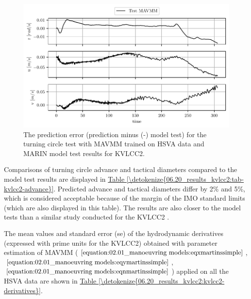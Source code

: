 \begin{figure}[h!]
\centering
\includegraphics[width=1.0\textwidth]{kappa/images/19.pdf}
\caption{The prediction error (prediction minus (-) model test) for the turning circle test with MAVMM trained on HSVA data and MARIN model test results for KVLCC2.}\label{\detokenize{06.20_results_kvlcc2:fig-kvlcc2-testing-sim-error}}\end{figure} 

Comparisons of turning circle advance and tactical diameters compared to the model test results are displayed in \hyperref[\detokenize{06.20_results_kvlcc2:tab-kvlcc2-advance}]{Table \ref{\detokenize{06.20_results_kvlcc2:tab-kvlcc2-advance}}}. Predicted advance and tactical diameters differ by 2\% and 5\%, which is considered acceptable because of the margin of the IMO standard limits (which are also displayed in this table). The results are also closer to the model tests than a similar study conducted for the KVLCC2 \cite{he_nonparametric_2022}.

\clearpage
The mean values and standard error (se) of the hydrodynamic derivatives (expressed with prime units for the KVLCC2) obtained with parameter estimation of MAVMM (\(\autoref{equation:02.01_manoeuvring models:eqxmartinssimple}\), \(\autoref{equation:02.01_manoeuvring models:eqymartinssimple}\), \(\autoref{equation:02.01_manoeuvring models:eqnmartinssimple}\)) applied on all the HSVA data are shown in \hyperref[\detokenize{06.20_results_kvlcc2:kvlcc2-derivatives}]{Table \ref{\detokenize{06.20_results_kvlcc2:kvlcc2-derivatives}}}.

\section*{}
\vspace{-1cm}
